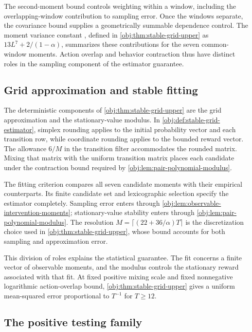 \documentclass[11pt]{article}
\begin{document}
The second-moment bound controls weighting within a window, including the overlapping-window contribution to sampling error. Once the windows separate, the covariance bound supplies a geometrically summable dependence control. The moment variance constant , defined in \cref{obj:thm:stable-grid-upper} as \(13L^7+2/(1-\alpha)\), summarizes these contributions for the seven common-window moments. Action overlap and behavior contraction thus have distinct roles in the sampling component of the estimator guarantee.

\subsection{Grid approximation and stable fitting}

The deterministic components of \cref{obj:thm:stable-grid-upper} are the grid approximation and the stationary-value modulus. In \cref{obj:def:stable-grid-estimator}, simplex rounding applies to the initial probability vector and each transition row, while coordinate rounding applies to the bounded reward vector. The allowance \(6/M\) in the transition filter accommodates the rounded matrix. Mixing that matrix with the uniform transition matrix places each candidate under the contraction bound required by \cref{obj:lem:pair-polynomial-modulus}.

The fitting criterion compares all seven candidate moments with their empirical counterparts. Its finite candidate set and lexicographic selection specify the estimator completely. Sampling error enters through \cref{obj:lem:observable-intervention-moments}; stationary-value stability enters through \cref{obj:lem:pair-polynomial-modulus}. The resolution \(M=\lceil(22+36/\alpha)T\rceil\) is the discretization choice used in \cref{obj:thm:stable-grid-upper}, whose bound accounts for both sampling and approximation error.

This division of roles explains the statistical guarantee. The fit concerns a finite vector of observable moments, and the modulus controls the stationary reward associated with that fit. At fixed positive mixing scale and fixed nonnegative logarithmic action-overlap bound, \cref{obj:thm:stable-grid-upper} gives a uniform mean-squared error proportional to \(T^{-1}\) for \(T\geq12\).

\subsection{The positive testing family}
\end{document}
